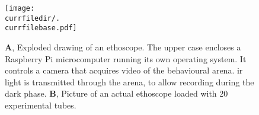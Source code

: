 \begin{figure}[h!]
  \centering   
   \texttt{[image: \\currfiledir/.\\currfilebase.pdf]}
  \caption[The Ethoscope]{
  	\textbf{A}, Exploded drawing of an ethoscope.
  	The upper case encloses a Raspberry Pi microcomputer running its own operating system.
  	It controls a camera that acquires video of the behavioural arena. \gls{ir} light is transmitted through the arena, to allow recording during the dark phase.
	\textbf{B}, Picture of an actual ethoscope loaded with 20 experimental tubes. 
  \label{fig:\currfilebase}
  }
\end{figure}






